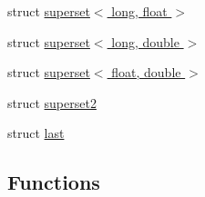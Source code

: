 \begin{DoxyCompactItemize}
\item 
struct \hyperlink{structcimg__library_1_1cimg_1_1superset_3_01long_00_01float_01_4}{superset$<$ long, float $>$}
\item 
struct \hyperlink{structcimg__library_1_1cimg_1_1superset_3_01long_00_01double_01_4}{superset$<$ long, double $>$}
\item 
struct \hyperlink{structcimg__library_1_1cimg_1_1superset_3_01float_00_01double_01_4}{superset$<$ float, double $>$}
\item 
struct \hyperlink{structcimg__library_1_1cimg_1_1superset2}{superset2}
\item 
struct \hyperlink{structcimg__library_1_1cimg_1_1last}{last}
\end{DoxyCompactItemize}
\subsection*{Functions}
